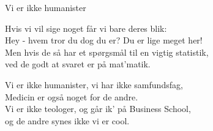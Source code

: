 \begin{song}{Vi er ikke humanister}
  \begin{SBVerse}
    Hvis vi vil sige noget får vi bare deres blik:\\
    Hey - hvem tror du dog du er? Du er lige meget her!\\
    Men hvis de så har et spørgsmål til en vigtig statistik,\\
    ved de godt at svaret er på mat’matik.
  \end{SBVerse}

  \begin{SBChorus}
    Vi er ikke humanister, vi har ikke samfundsfag,\\
    Medicin er også noget for de andre.\\
    Vi er ikke teologer, og går ik’ på Business School,\\
    og de andre synes ikke vi er cool.
  \end{SBChorus}

\end{song}
